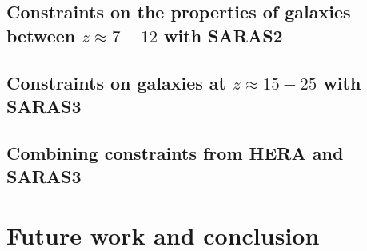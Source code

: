 \documentclass[a4paper,11pt,twoside,extrafontsizes,oldfontcommands]{memoir}
\begin{document}
\chapter{Constraints on the properties of galaxies between $z\approx7-12$ with SARAS2}
\label{ch:saras2}


\chapter{Constraints on galaxies at $z\approx 15 - 25$ with SARAS3}
\label{ch:saras3}


\chapter{Combining constraints from HERA and SARAS3}
\label{ch:hera_saras3}
%


\part{Future work and conclusion}

\label{ch:futrue_plans}




\end{document}
